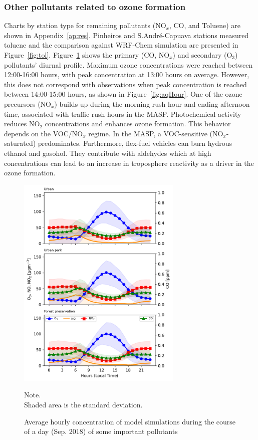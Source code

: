 \subsubsection{Other pollutants related to ozone formation} 
Charts by station type for remaining pollutants (NO$_x$, CO, and Toluene) are shown in Appendix~\ref{ap:res}.
Pinheiros and S.Andr\'{e}-Capuava stations measured toluene and the comparison against WRF-Chem simulation are presented in Figure~\ref{fig:tol}.
Figure~\ref{fig: Variation_pol_day} shows the primary (CO, NO$_x$) and secondary (O$_3$) pollutants' diurnal profile.
Maximum ozone concentrations were reached between 12:00-16:00 hours, with peak concentration at 13:00 hours on average.
However, this does not correspond with observations when peak concentration is reached between 14:00-15:00 hours, as shown in Figure~\ref{fig:aqHour}.
One of the ozone precursors (NO$_x$) builds up during the morning rush hour and ending afternoon time, associated with traffic rush hours in the MASP.
Photochemical activity reduces NO$_2$ concentrations and enhances ozone formation.
This behavior depends on the VOC/NO$_x$ regime.
In the MASP, a VOC-sensitive (NO$_x$-saturated) predominates.
Furthermore, flex-fuel vehicles can burn hydrous ethanol and gasohol.
They contribute with aldehydes \citep{Nogueira2014} which at high concentrations can lead to an increase in troposphere reactivity as a driver in the ozone formation.

\begin{figure}[!hbt]
	\begin{center}
		\includegraphics[width=0.7\textwidth]{fig/Variation_pol_day}
	\end{center}
  \caption{Average hourly concentration of model simulations during the course of a day (Sep. 2018) of some important pollutants}
  {\scriptsize Note.\\ Shaded area is the standard deviation.}
  \label{fig: Variation_pol_day}
\end{figure}

